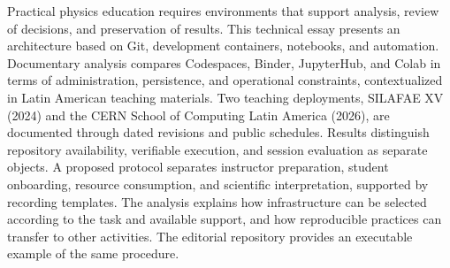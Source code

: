 Practical physics education requires environments that support analysis, review of decisions, and preservation of results. This technical essay presents an architecture based on Git, development containers, notebooks, and automation. Documentary analysis compares Codespaces, Binder, JupyterHub, and Colab in terms of administration, persistence, and operational constraints, contextualized in Latin American teaching materials. Two teaching deployments, SILAFAE XV (2024) and the CERN School of Computing Latin America (2026), are documented through dated revisions and public schedules. Results distinguish repository availability, verifiable execution, and session evaluation as separate objects. A proposed protocol separates instructor preparation, student onboarding, resource consumption, and scientific interpretation, supported by recording templates. The analysis explains how infrastructure can be selected according to the task and available support, and how reproducible practices can transfer to other activities. The editorial repository provides an executable example of the same procedure.
